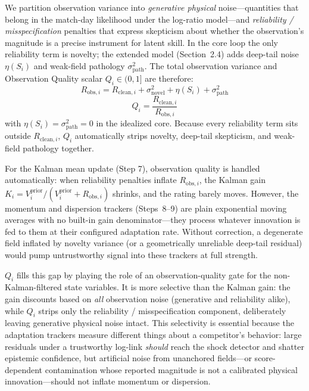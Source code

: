 \documentclass[12pt]{article}
\begin{document}
	We partition observation variance into \emph{generative physical} noise---quantities that belong in the match-day likelihood under the log-ratio model---and \emph{reliability / misspecification} penalties that express skepticism about whether the observation's magnitude is a precise instrument for latent skill. In the core loop the only reliability term is novelty; the extended model (Section~2.4) adds deep-tail noise $\eta(S_i)$ and weak-field pathology $\sigma_{\mathrm{path}}^2$. The total observation variance and Observation Quality scalar $Q_i \in (0,1]$ are therefore:
	\begin{equation}
		R_{\mathrm{obs},i} = R_{\mathrm{clean},i} + \sigma_{\mathrm{novel}}^2 + \eta(S_i) + \sigma_{\mathrm{path}}^2
	\end{equation}
	\begin{equation}
		Q_i = \frac{R_{\mathrm{clean},i}}{R_{\mathrm{obs},i}}
	\end{equation}
	with $\eta(S_i) = \sigma_{\mathrm{path}}^2 = 0$ in the idealized core. Because every reliability term sits outside $R_{\mathrm{clean},i}$, $Q_i$ automatically strips novelty, deep-tail skepticism, and weak-field pathology together.

	For the Kalman mean update (Step 7), observation quality is handled automatically: when reliability penalties inflate $R_{\mathrm{obs},i}$, the Kalman gain $K_i = V_i^{\mathrm{prior}} / (V_i^{\mathrm{prior}} + R_{\mathrm{obs},i})$ shrinks, and the rating barely moves. However, the momentum and dispersion trackers \mbox{(Steps 8--9)} are plain exponential moving averages with no built-in gain denominator---they process whatever innovation is fed to them at their configured adaptation rate. Without correction, a degenerate field inflated by novelty variance (or a geometrically unreliable deep-tail residual) would pump untrustworthy signal into these trackers at full strength.

	$Q_i$ fills this gap by playing the role of an observation-quality gate for the non-Kalman-filtered state variables. It is more selective than the Kalman gain: the gain discounts based on \emph{all} observation noise (generative and reliability alike), while $Q_i$ strips only the reliability / misspecification component, deliberately leaving generative physical noise intact. This selectivity is essential because the adaptation trackers measure different things about a competitor's behavior: large residuals under a trustworthy log-link \emph{should} reach the shock detector and shatter epistemic confidence, but artificial noise from unanchored fields---or score-dependent contamination whose reported magnitude is not a calibrated physical innovation---should not inflate momentum or dispersion.
\end{document}
